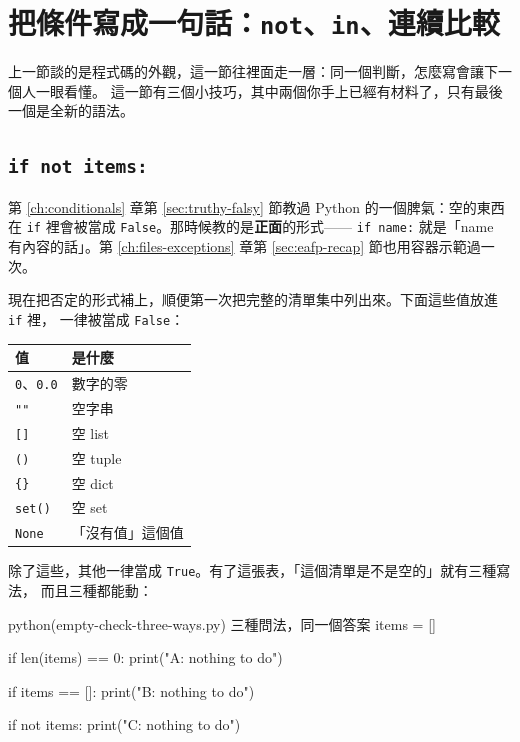 \section{把條件寫成一句話：\texttt{not}、\texttt{in}、連續比較}
\label{sec:condition-idioms}

上一節談的是程式碼的外觀，這一節往裡面走一層：同一個判斷，怎麼寫會讓下一個人一眼看懂。
這一節有三個小技巧，其中兩個你手上已經有材料了，只有最後一個是全新的語法。

\subsection*{\texttt{if not items:}}

第 \ref{ch:conditionals} 章第 \ref{sec:truthy-falsy} 節教過 Python 的一個脾氣：空的東西
在 \texttt{if} 裡會被當成 \texttt{False}。那時候教的是\textbf{正面}的形式——
\texttt{if name:} 就是「name 有內容的話」。第 \ref{ch:files-exceptions} 章第
\ref{sec:eafp-recap} 節也用容器示範過一次。

現在把否定的形式補上，順便第一次把完整的清單集中列出來。下面這些值放進 \texttt{if} 裡，
一律被當成 \texttt{False}：

\begin{center}
\begin{tabular}{@{}ll@{}}
\toprule
值 & 是什麼 \\
\midrule
\texttt{0}、\texttt{0.0} & 數字的零 \\
\texttt{""} & 空字串 \\
\texttt{[]} & 空 list \\
\texttt{()} & 空 tuple \\
\texttt{\{\}} & 空 dict \\
\texttt{set()} & 空 set \\
\texttt{None} & 「沒有值」這個值 \\
\bottomrule
\end{tabular}
\end{center}

除了這些，其他一律當成 \texttt{True}。有了這張表，「這個清單是不是空的」就有三種寫法，
而且三種都能動：

\begin{example}{python}{(empty-check-three-ways.py) 三種問法，同一個答案}
items = []

if len(items) == 0:
    print("A: nothing to do")

if items == []:
    print("B: nothing to do")

if not items:
    print("C: nothing to do")
\end{example}


